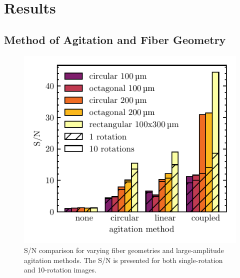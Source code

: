 \section{Results}
\label{sec:results}

\subsection{Method of Agitation and Fiber Geometry}
\label{subsec:ag_snr}

\begin{figure}
\centering
	\includegraphics[width=\columnwidth]{figures-2/ag_snr.pdf}
	\caption[Signal-to-noise comparison across fiber geometry and agitation method]{S/N comparison for varying fiber geometries and large-amplitude agitation methods. The S/N is presented for both single-rotation and 10-rotation images.}
\label{fig:ag_snr}
\end{figure}

